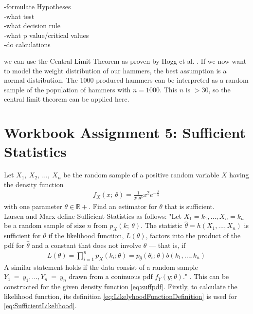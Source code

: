 -formulate Hypotheses\\
-what test\\
-what decision rule\\
-what p value/critical values\\
-do calculations




we can use the Central Limit Theorem as proven by Hogg et al. \cite[Theorem~5.3.1]{hogg}. 
If we now want to model the weight distribution of our hammers, the best assumption is a normal distribution. The 1000 produced hammers can be interpreted as a random sample of the population of hammers with $n = 1000$. This $n$ is $>30$, so the central limit theorem can be applied here. 



\chapter{Workbook Assignment 5: Sufficient Statistics}	
Let $X_1,~X_2,~...,~X_n$ be the random sample of a positive random variable $X$ having the density function 
\begin{equation}
\begin{split}
f_X(x;~\theta) = \frac{1}{2!~\theta^3}x^2e^{-\frac{x}{\theta}}
\end{split}
\label{eq:suffpdf}
\end{equation}
with one parameter $\theta \in \mathbb{R}+$. Find an estimator for $\theta$ that is sufficient. 
\\
Larsen and Marx define Sufficient Statistics as follows: "Let $X_1 = k_1, . . . , X_n = k_n$ be a random sample of size $n$ from $p_X(k;~\theta)$. The statistic $\hat{\theta} = h(X_1, . . . , X_n)$ is sufficient for $\theta$ if the likelihood function, $L(\theta)$, factors into the product of the pdf for $\hat{\theta}$ and a constant that does not involve $\theta$ — that is, if
\begin{equation}
\begin{split}
L(\theta) 
= \prod_{i=1}^n p_X(k_i;\theta)
=p_{\hat{\theta}}(\theta_e;\theta)b(k_1,...,k_n)
\end{split}
\label{eq:SufficientLikelihood}
\end{equation}
A similar statement holds if the data consist of a random sample $Y_1~=~y_1,...,Y_n~=~ y_n$ drawn from a coninuous pdf $f_Y(y;\theta)$." \cite{larsen2005introduction}.
This can be constructed for the given density function \eqref{eq:suffpdf}. Firstly, to calculate the likelihood function, its definition \eqref{eq:LikelyhoodFunctionDefinition} is used for \eqref{eq:SufficientLikelihood}.
